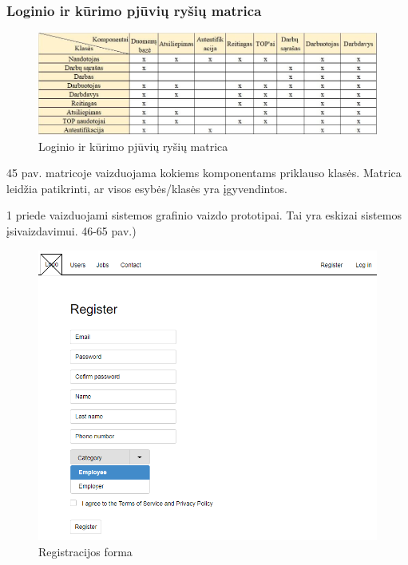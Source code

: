\documentclass{VUMIFPSkursinis}
\begin{document}
\subsubsection{Loginio ir kūrimo pjūvių ryšių matrica}
\begin{figure}[H]
\centering
\includegraphics[width=\linewidth, frame]{img/matricaLK.jpg}
\caption{Loginio ir kūrimo pjūvių ryšių matrica}
\end{figure}
45 pav. matricoje vaizduojama kokiems komponentams priklauso klasės. Matrica leidžia patikrinti, ar visos esybės/klasės yra įgyvendintos.

1 priede vaizduojami sistemos grafinio vaizdo prototipai. Tai yra eskizai sistemos įsivaizdavimui. 46-65 pav.)
\begin{figure}[H]
\centering
\includegraphics[width=\linewidth, frame]{img/registerForm.png}
\caption{Registracijos forma}
\end{figure}
\end{document}
